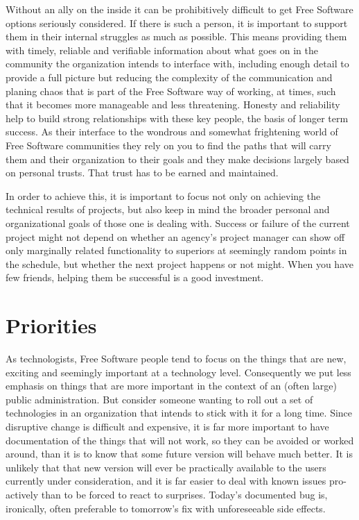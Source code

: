 Without an ally on the inside it can be prohibitively difficult to get
Free Software options seriously considered. If there is such a person, it is important
to support them in their internal struggles as much as possible. This
means providing them with timely, reliable and verifiable information about
what goes on in the community the organization intends to interface with,
including enough detail to provide a full picture but reducing the
complexity of the communication and planing chaos that is part of the Free
Software way of working, at times, such that it becomes more manageable and
less threatening. Honesty and reliability help to build strong
relationships with these key people, the basis of longer term success. As
their interface to the wondrous and somewhat frightening world of Free
Software communities they rely on you to find the paths that will carry
them and their organization to their goals and they make decisions largely
based on personal trusts. That trust has to be earned and maintained.

In order to achieve this, it is important to focus not only on achieving
the technical results of projects, but also keep in mind the broader personal and organizational
goals of those one is dealing with. Success or failure of the current
project might not depend on whether an agency's project manager can show off
only marginally related functionality to superiors at seemingly random points
in the schedule, but whether the next project happens or not might. When you have
few friends, helping them be successful is a good investment.

\section*{Priorities}

As technologists, Free Software people tend to focus on the things that are
new, exciting and seemingly important at a technology level. Consequently we
put less emphasis on things that are more important in the context of an (often
large) public administration. But consider someone wanting to roll out a
set of technologies in an organization that intends to stick with it for a long
time. Since disruptive change is difficult and expensive, it is far more
important to have documentation of the things that will not work, so they can
be avoided or worked around, than it is to know that some future version will
behave much better. It is unlikely that that new version will ever be
practically available to the users currently under consideration, and it is far
easier to deal with known issues pro-actively than to be forced to react to
surprises.  Today's documented bug is, ironically, often preferable to
tomorrow's fix with unforeseeable side effects.

